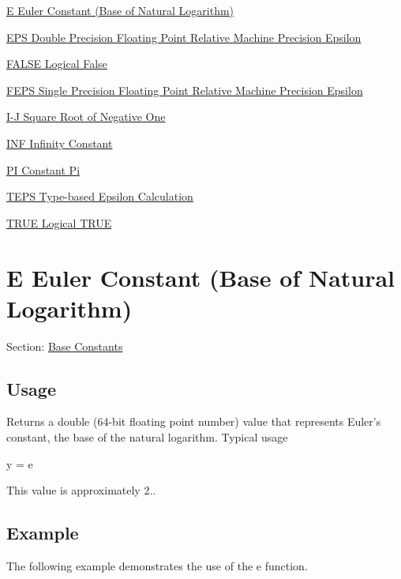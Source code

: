 
\begin{DoxyItemize}
\item \hyperlink{constants_e}{E Euler Constant (Base of Natural Logarithm)}  
\item \hyperlink{constants_eps}{E\-P\-S Double Precision Floating Point Relative Machine Precision Epsilon}  
\item \hyperlink{constants_false}{F\-A\-L\-S\-E Logical False}  
\item \hyperlink{constants_feps}{F\-E\-P\-S Single Precision Floating Point Relative Machine Precision Epsilon}  
\item \hyperlink{constants_i}{I-\/\-J Square Root of Negative One}  
\item \hyperlink{constants_inf}{I\-N\-F Infinity Constant}  
\item \hyperlink{constants_pi}{P\-I Constant Pi}  
\item \hyperlink{constants_teps}{T\-E\-P\-S Type-\/based Epsilon Calculation}  
\item \hyperlink{constants_true}{T\-R\-U\-E Logical T\-R\-U\-E}  
\end{DoxyItemize}\hypertarget{constants_e}{}\section{E Euler Constant (Base of Natural Logarithm)}\label{constants_e}
Section\-: \hyperlink{sec_constants}{Base Constants} \hypertarget{vtkwidgets_vtkxyplotwidget_Usage}{}\subsection{Usage}\label{vtkwidgets_vtkxyplotwidget_Usage}
Returns a {\ttfamily double} (64-\/bit floating point number) value that represents Euler's constant, the base of the natural logarithm. Typical usage \begin{DoxyVerb}   y = e
\end{DoxyVerb}
 This value is approximately 2.. \hypertarget{variables_struct_Example}{}\subsection{Example}\label{variables_struct_Example}
The following example demonstrates the use of the {\ttfamily e} function.


